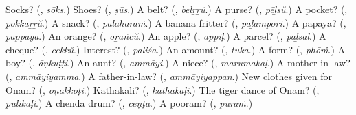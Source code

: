 \begin{tcolorbox}[breakable,colback=teal!4,colframe=teal!35!black,title={Before you move on}]
Socks? (\textbf{}, \emph{sōks}.) Shoes? (\textbf{}, \emph{ṣūs}.) A belt? (\textbf{}, \emph{belṟṟŭ}.) A purse? (\textbf{}, \emph{pēḻsŭ}.) A pocket? (\textbf{}, \emph{pōkkaṟṟŭ}.) A snack? (\textbf{}, \emph{palahāraṁ}.) A banana fritter? (\textbf{}, \emph{paḻampori}.) A papaya? (\textbf{}, \emph{pappāya}.) An orange? (\textbf{}, \emph{ōṟañcŭ}.) An apple? (\textbf{}, \emph{āppiḷ}.) A parcel? (\textbf{}, \emph{pāḻsal}.) A cheque? (\textbf{}, \emph{cekkŭ}.) Interest? (\textbf{}, \emph{paliśa}.) An amount? (\textbf{}, \emph{tuka}.) A form? (\textbf{}, \emph{phōṁ}.) A boy? (\textbf{}, \emph{āṇkuṭṭi}.) An aunt? (\textbf{}, \emph{ammāyi}.) A niece? (\textbf{}, \emph{marumakaḷ}.) A mother-in-law? (\textbf{}, \emph{ammāyiyamma}.) A father-in-law? (\textbf{}, \emph{ammāyiyappan}.) New clothes given for Onam? (\textbf{}, \emph{ōṇakkōṭi}.) Kathakali? (\textbf{}, \emph{kathakaḷi}.) The tiger dance of Onam? (\textbf{}, \emph{pulikaḷi}.) A chenda drum? (\textbf{}, \emph{ceṇṭa}.) A pooram? (\textbf{}, \emph{pūraṁ}.)
\end{tcolorbox}
